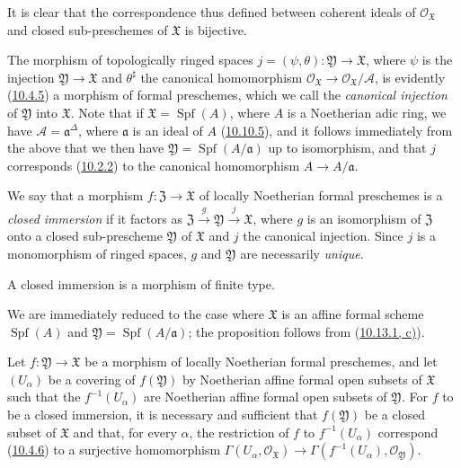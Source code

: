 It is clear that the correspondence thus defined between
coherent ideals of $\mathscr{O}_{\mathfrak{X}}$ and closed sub-preschemes of
$\mathfrak{X}$ is bijective.

The morphism of topologically ringed spaces
$j=(\psi,\theta):\mathfrak{Y}\to\mathfrak{X}$, where $\psi$ is the injection
$\mathfrak{Y}\to\mathfrak{X}$ and $\theta^\sharp$ the canonical homomorphism
$\mathscr{O}_{\mathfrak{X}}\to\mathscr{O}_{\mathfrak{X}}/\mathscr{A}$, is
evidently (\hyperref[I.10.4.5]{10.4.5}) a morphism of formal preschemes,
which we call the \emph{canonical injection} of $\mathfrak{Y}$ into
$\mathfrak{X}$. Note that if $\mathfrak{X}=\operatorname{Spf}(A)$, where $A$
is a Noetherian adic ring, we have $\mathscr{A}=\mathfrak{a}^\Delta$, where
$\mathfrak{a}$ is an ideal of $A$ (\hyperref[I.10.10.5]{10.10.5}), and it
follows immediately from the above that we then have
$\mathfrak{Y}=\operatorname{Spf}(A/\mathfrak{a})$ up to isomorphism, and that
$j$ corresponds (\hyperref[I.10.2.2]{10.2.2}) to the canonical homomorphism
$A\to A/\mathfrak{a}$.

We say that a morphism $f:\mathfrak{Z}\to\mathfrak{X}$ of locally Noetherian
formal preschemes is a \emph{closed immersion} if it factors as
$\mathfrak{Z}\xrightarrow{g}\mathfrak{Y}\xrightarrow{j}\mathfrak{X}$, where $g$
is an isomorphism of $\mathfrak{Z}$ onto a closed sub-prescheme
$\mathfrak{Y}$ of $\mathfrak{X}$ and $j$ the canonical injection. Since $j$ is
a monomorphism of ringed spaces, $g$ and $\mathfrak{Y}$ are necessarily
\emph{unique}.

\begin{proposition}[10.14.3]
\label{I.10.14.3}
A closed immersion is a morphism of finite type.
\end{proposition}

We are immediately reduced to the case where $\mathfrak{X}$ is an affine
formal scheme $\operatorname{Spf}(A)$ and
$\mathfrak{Y}=\operatorname{Spf}(A/\mathfrak{a})$;
the proposition follows from (\hyperref[I.10.13.1]{10.13.1, c)}).

\begin{lemma}[10.14.4]
\label{I.10.14.4}
Let $f:\mathfrak{Y}\to\mathfrak{X}$ be a morphism of locally Noetherian
formal preschemes, and let $(U_\alpha)$ be a covering of
$f(\mathfrak{Y})$ by Noetherian affine formal open subsets of
$\mathfrak{X}$ such that the $f^{-1}(U_\alpha)$ are Noetherian affine formal
open subsets of $\mathfrak{Y}$. For $f$ to be a closed immersion,
it is necessary and sufficient that $f(\mathfrak{Y})$ be a closed subset of
$\mathfrak{X}$ and that, for every $\alpha$, the restriction of $f$ to
$f^{-1}(U_\alpha)$ correspond (\hyperref[I.10.4.6]{10.4.6}) to a
surjective homomorphism
$\Gamma(U_\alpha,\mathscr{O}_{\mathfrak{X}})\to
\Gamma(f^{-1}(U_\alpha),\mathscr{O}_{\mathfrak{Y}})$.
\end{lemma}

